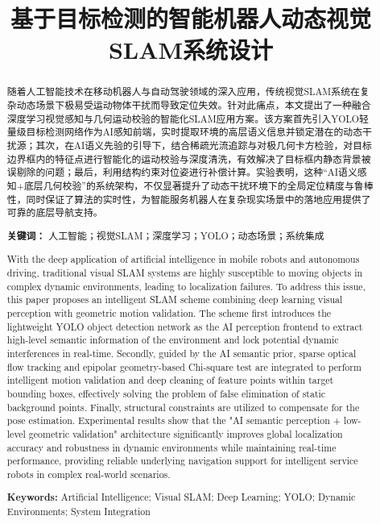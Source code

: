 \documentclass[12pt, a4paper]{ctexart}
\title{基于目标检测的智能机器人动态视觉SLAM系统设计}
\author{}
\date{}
\begin{document}
\maketitle

\begin{abstract}
随着人工智能技术在移动机器人与自动驾驶领域的深入应用，传统视觉SLAM系统在复杂动态场景下极易受运动物体干扰而导致定位失效。针对此痛点，本文提出了一种融合深度学习视觉感知与几何运动校验的智能化SLAM应用方案。该方案首先引入YOLO轻量级目标检测网络作为AI感知前端，实时提取环境的高层语义信息并锁定潜在的动态干扰源；其次，在AI语义先验的引导下，结合稀疏光流追踪与对极几何卡方检验，对目标边界框内的特征点进行智能化的运动校验与深度清洗，有效解决了目标框内静态背景被误剔除的问题；最后，利用结构约束对位姿进行补偿计算。实验表明，这种“AI语义感知+底层几何校验”的系统架构，不仅显著提升了动态干扰环境下的全局定位精度与鲁棒性，同时保证了算法的实时性，为智能服务机器人在复杂现实场景中的落地应用提供了可靠的底层导航支持。

\noindent \textbf{关键词：} 人工智能；视觉SLAM；深度学习；YOLO；动态场景；系统集成
\end{abstract}

\renewcommand{\abstractname}{\textbf{Abstract}}
\begin{abstract}
With the deep application of artificial intelligence in mobile robots and autonomous driving, traditional visual SLAM systems are highly susceptible to moving objects in complex dynamic environments, leading to localization failures. To address this issue, this paper proposes an intelligent SLAM scheme combining deep learning visual perception with geometric motion validation. The scheme first introduces the lightweight YOLO object detection network as the AI perception frontend to extract high-level semantic information of the environment and lock potential dynamic interferences in real-time. Secondly, guided by the AI semantic prior, sparse optical flow tracking and epipolar geometry-based Chi-square test are integrated to perform intelligent motion validation and deep cleaning of feature points within target bounding boxes, effectively solving the problem of false elimination of static background points. Finally, structural constraints are utilized to compensate for the pose estimation. Experimental results show that the "AI semantic perception + low-level geometric validation" architecture significantly improves global localization accuracy and robustness in dynamic environments while maintaining real-time performance, providing reliable underlying navigation support for intelligent service robots in complex real-world scenarios.

\noindent \textbf{Keywords:} Artificial Intelligence; Visual SLAM; Deep Learning; YOLO; Dynamic Environments; System Integration
\end{abstract}
\end{document}
